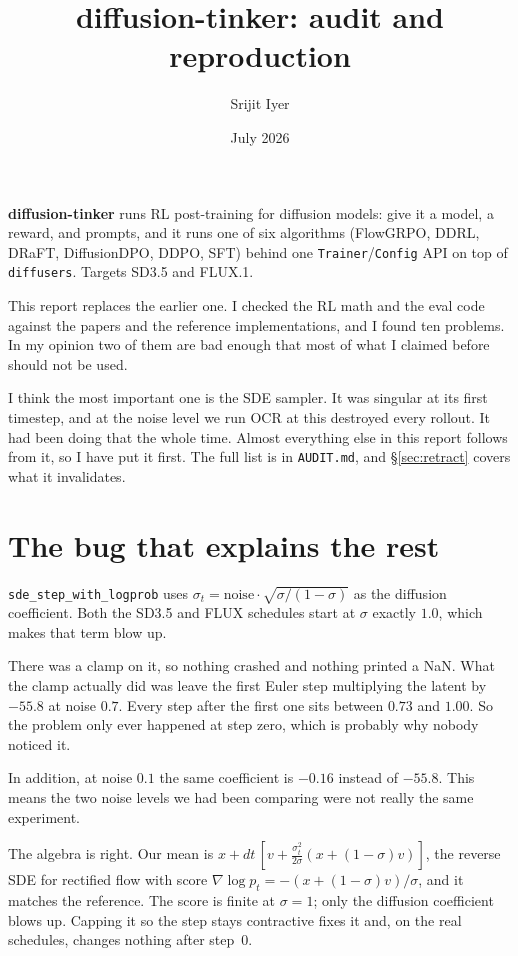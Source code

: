 \documentclass[11pt]{article}
\title{\vspace{-2em}\textbf{diffusion-tinker: audit and reproduction}}
\author{Srijit Iyer}
\date{July 2026}
\newcommand{\code}[1]{\texttt{\small #1}}
\begin{document}
\maketitle
\vspace{-1.5em}

\noindent\textbf{diffusion-tinker} runs RL post-training for diffusion models: give it a model, a reward, and prompts, and it runs one of six algorithms (FlowGRPO, DDRL, DRaFT, DiffusionDPO, DDPO, SFT) behind one \code{Trainer}/\code{Config} API on top of \code{diffusers}. Targets SD3.5 and FLUX.1.

This report replaces the earlier one. I checked the RL math and the eval code against the papers and the reference implementations, and I found ten problems. In my opinion two of them are bad enough that most of what I claimed before should not be used.

I think the most important one is the SDE sampler. It was singular at its first timestep, and at the noise level we run OCR at this destroyed every rollout. It had been doing that the whole time. Almost everything else in this report follows from it, so I have put it first. The full list is in \code{AUDIT.md}, and \S\ref{sec:retract} covers what it invalidates.

\section{The bug that explains the rest}

\code{sde\_step\_with\_logprob} uses $\sigma_t = \text{noise}\cdot\sqrt{\sigma/(1-\sigma)}$ as the diffusion coefficient. Both the SD3.5 and FLUX schedules start at $\sigma$ exactly $1.0$, which makes that term blow up.

There was a clamp on it, so nothing crashed and nothing printed a NaN. What the clamp actually did was leave the first Euler step multiplying the latent by $-55.8$ at noise $0.7$. Every step after the first one sits between $0.73$ and $1.00$. So the problem only ever happened at step zero, which is probably why nobody noticed it.

In addition, at noise $0.1$ the same coefficient is $-0.16$ instead of $-55.8$. This means the two noise levels we had been comparing were not really the same experiment.

The algebra is right. Our mean is $x + dt\,[v + \tfrac{\sigma_t^2}{2\sigma}(x + (1-\sigma)v)]$, the reverse SDE for rectified flow with score $\nabla\log p_t = -(x+(1-\sigma)v)/\sigma$, and it matches the reference. The score is finite at $\sigma=1$; only the diffusion coefficient blows up. Capping it so the step stays contractive fixes it and, on the real schedules, changes nothing after step~0.
\end{document}
